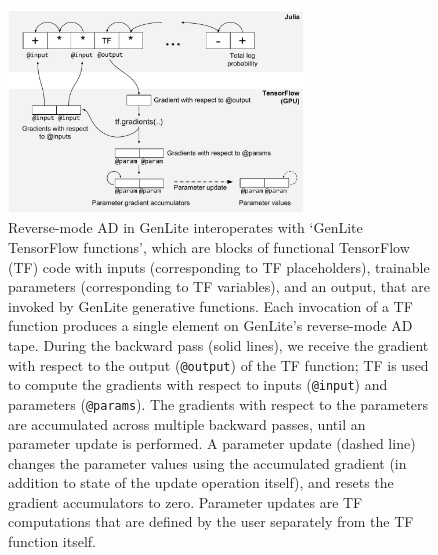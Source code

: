 \documentclass{article}
\begin{document}
\begin{figure}[h]
\centering
    \includegraphics[width=0.7\textwidth]{images/tf-integration-schematic.pdf}
    \caption{
Reverse-mode AD in GenLite interoperates with `GenLite TensorFlow functions', which are blocks of functional TensorFlow (TF) code with inputs (corresponding to TF placeholders), trainable parameters (corresponding to TF variables), and an output, that are invoked by GenLite generative functions.
Each invocation of a TF function produces a single element on GenLite's reverse-mode AD tape.
During the backward pass (solid lines), we receive the gradient with respect to the output (\texttt{@output}) of the TF function; TF is used to compute the gradients with respect to inputs (\texttt{@input}) and parameters (\texttt{@params}).
The gradients with respect to the parameters are accumulated across multiple backward passes, until an parameter update is performed.
A parameter update (dashed line) changes the parameter values using the accumulated gradient (in addition to state of the update operation itself), and resets the gradient accumulators to zero.
Parameter updates are TF computations that are defined by the user separately from the TF function itself.
}
    \label{fig:tf-integration-schematic}
\end{figure}





\end{document}
